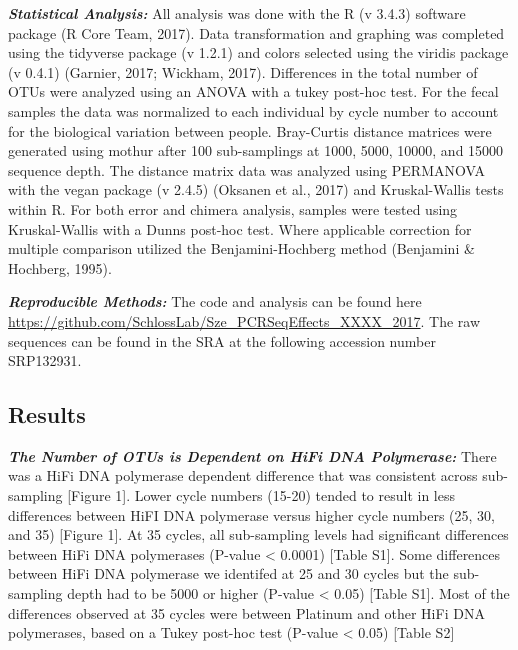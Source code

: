 \documentclass[12pt,]{article}
\begin{document}
\textbf{\emph{Statistical Analysis:}} All analysis was done with the R
(v 3.4.3) software package (R Core Team, 2017). Data transformation and
graphing was completed using the tidyverse package (v 1.2.1) and colors
selected using the viridis package (v 0.4.1) (Garnier, 2017; Wickham,
2017). Differences in the total number of OTUs were analyzed using an
ANOVA with a tukey post-hoc test. For the fecal samples the data was
normalized to each individual by cycle number to account for the
biological variation between people. Bray-Curtis distance matrices were
generated using mothur after 100 sub-samplings at 1000, 5000, 10000, and
15000 sequence depth. The distance matrix data was analyzed using
PERMANOVA with the vegan package (v 2.4.5) (Oksanen et al., 2017) and
Kruskal-Wallis tests within R. For both error and chimera analysis,
samples were tested using Kruskal-Wallis with a Dunns post-hoc test.
Where applicable correction for multiple comparison utilized the
Benjamini-Hochberg method (Benjamini \& Hochberg, 1995).

\textbf{\emph{Reproducible Methods:}} The code and analysis can be found
here \url{https://github.com/SchlossLab/Sze_PCRSeqEffects_XXXX_2017}.
The raw sequences can be found in the SRA at the following accession
number SRP132931.

\newpage

\subsection{Results}\label{results}

\textbf{\emph{The Number of OTUs is Dependent on HiFi DNA Polymerase:}}
There was a HiFi DNA polymerase dependent difference that was consistent
across sub-sampling {[}Figure 1{]}. Lower cycle numbers (15-20) tended
to result in less differences between HiFI DNA polymerase versus higher
cycle numbers (25, 30, and 35) {[}Figure 1{]}. At 35 cycles, all
sub-sampling levels had significant differences between HiFi DNA
polymerases (P-value \textless{} 0.0001) {[}Table S1{]}. Some
differences between HiFi DNA polymerase we identifed at 25 and 30 cycles
but the sub-sampling depth had to be 5000 or higher (P-value \textless{}
0.05) {[}Table S1{]}. Most of the differences observed at 35 cycles were
between Platinum and other HiFi DNA polymerases, based on a Tukey
post-hoc test (P-value \textless{} 0.05) {[}Table S2{]}
\end{document}

